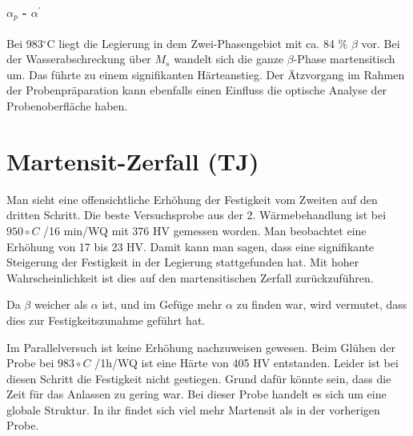 \paragraph{$\alpha_p$ - $\alpha^\prime$}

Bei 983$^\circ$C liegt die Legierung in dem  Zwei-Phasengebiet mit ca. 84 \% $\beta$ vor. Bei der Wasserabschreckung über $M_s$ wandelt sich die ganze $\beta$-Phase martensitisch um. Das führte zu einem signifikanten Härteanstieg. Der Ätzvorgang im Rahmen der Probenpräparation kann ebenfalls einen Einfluss die optische Analyse der Probenoberfläche haben. 

\section{Martensit-Zerfall (TJ)}

Man sieht eine offensichtliche Erhöhung der Festigkeit vom Zweiten auf den dritten Schritt. Die beste Versuchsprobe aus der 2. Wärmebehandlung ist bei $950\circ C$ /16 min/WQ mit 376 HV gemessen worden. Man beobachtet eine Erhöhung von 17 bis 23 HV. Damit kann man sagen, dass eine signifikante Steigerung der Festigkeit in der Legierung stattgefunden hat. Mit hoher Wahrscheinlichkeit ist dies auf den martensitischen Zerfall zurückzuführen. 

Da $\beta$ weicher als $\alpha$ ist, und im Gefüge mehr $\alpha$ zu finden war, wird vermutet, dass dies zur Festigkeitszunahme geführt hat.

Im Parallelversuch ist keine Erhöhung nachzuweisen gewesen. Beim Glühen der Probe bei $983\circ C$ /1h/WQ ist eine Härte von 405 HV entstanden. Leider ist bei diesen Schritt die Festigkeit nicht gestiegen. Grund dafür könnte sein, dass die Zeit für das Anlassen zu gering war. Bei dieser Probe handelt es sich um eine globale Struktur. In ihr findet sich viel mehr Martensit als in der vorherigen Probe.


